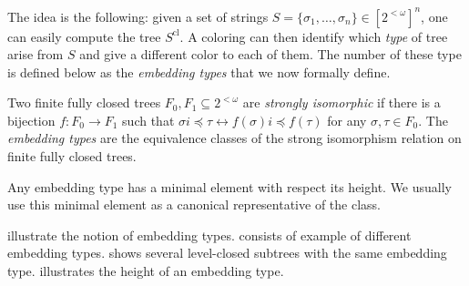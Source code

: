 The idea is the following: given a set of strings $S = \{\sigma_1, \dots, \sigma_n\} \in [2^{<\omega}]^n$, one can easily compute the tree $S^{\mathrm{cl}}$. A coloring can then identify which \emph{type} of tree arise from $S$ and give a different color to each of them. The number of these type is defined below as the \emph{embedding types} that we now formally define.
  
\begin{definition}
Two finite fully closed trees $F_0,F_1 \subseteq 2^{<\omega}$ are \emph{strongly isomorphic} if there is a bijection $f:F_0 \rightarrow F_1$ such that $\sigma i \preceq \tau \leftrightarrow f(\sigma) i \preceq f(\tau)$ for any $\sigma, \tau \in F_0$. The \emph{embedding types} are the equivalence classes of the strong isomorphism relation on finite fully closed trees.
\end{definition}  
 
Any embedding type has a minimal element with respect its height. We usually use this minimal element as a canonical representative of the class.

 illustrate the notion of embedding types.  consists of example of different embedding types.  shows several level-closed subtrees with the same embedding type.  illustrates the height of an embedding type.

